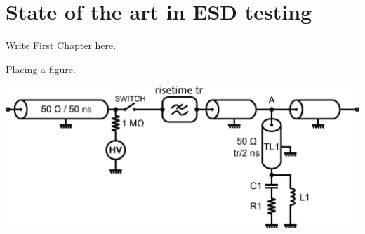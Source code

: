 \section{State of the art in ESD testing}

Write First Chapter here.

Placing a figure.

\includegraphics{src/1/figures/tlp_iec.png}
